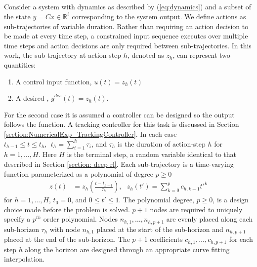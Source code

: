 \documentclass{UnderReview}
\begin{document}
\subsection{}\label{section:HLAS}
Consider a system with dynamics as described by (\ref{eq:dynamics}) and a subset of the state $y=Cx\in\mathbb{R}^\ell$ corresponding to the system output.  We define actions as sub-trajectories of variable duration.  Rather than requiring an action decision to be made at every time step, a constrained input sequence executes over multiple time steps and action decisions are only required between sub-trajectories.  In this work, the sub-trajectory at action-step $h$, denoted as $z_h$, can represent two quantities:
\begin{enumerate}
	\item A control input function, $u(t)=z_h(t)$
	\item A desired , $\dot y^{des}(t)=z_h(t)$.  
\end{enumerate}
For the second case it is assumed a controller can be designed so the output follows the  function.  A tracking controller for this task is discussed in Section \ref{section:NumericalExp_TrackingController}.
In each case $t_{h-1} \leq t \leq t_{h}, ~~t_{h} = \sum_{i=1}^{h}\tau_i$, and $\tau_h$ is the duration of action-step $h$ for $h=1,\dots, H$.  Here $H$ is the terminal step, a random variable identical to that described in Section \ref{section: deep rl}.  Each sub-trajectory is a time-varying function parameterized as a polynomial of degree $p \geq 0$ 
	\begin{align}\label{eq:z}
		z(t) &= z_h\left(\frac{t-t_{h-1}}{\tau_h}\right), ~~~
		z_h(t') = \sum_{k=0}^{p} c_{h,k+1} t'^k
	\end{align}
for $h=1,\dots,H$, $t_0=0$, and $0\leq t' \leq 1$.  The polynomial degree, $p \geq 0$, is a design choice made before the problem is solved.  $p+1$ nodes are required to uniquely specify a $p^{th}$ order polynomial.  Nodes $n_{h,1}, \dots, n_{h,p+1}$ are evenly placed along each sub-horizon $\tau_h$ with node $n_{h,1}$ placed at the start of the sub-horizon and $n_{h,p+1}$ placed at the end of the sub-horizon.   The $p+1$ coefficients $c_{h,1},\dots, c_{h,p+1}$ for each step $h$ along the horizon are designed through an appropriate curve fitting interpolation. 
\end{document}
